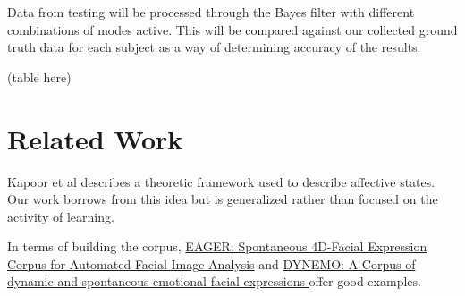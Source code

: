 \documentclass[12pt,letterpaper]{article}
\begin{document}
Data from testing will be processed through the Bayes filter with different combinations of modes active.  This will be compared against our collected ground truth data for each subject as a way of determining accuracy of the results.

(table here)



\section{Related Work}
Kapoor et al \cite{kapoor2001towards} describes a theoretic framework used to describe affective states.  Our work borrows from this idea but is generalized rather than focused on the activity of learning.


In terms of building the corpus,  \href{http://www.pitt.edu/~jeffcohn/FinalReport_EAGER.pdf}{EAGER: Spontaneous 4D-Facial Expression Corpus for
Automated Facial Image Analysis} and \href{http://membres-lig.imag.fr/adam/documents/LREC_Dynemo_MMC.pdf}{DYNEMO: A Corpus of dynamic and spontaneous emotional facial expressions } offer good examples.
\end{document}
